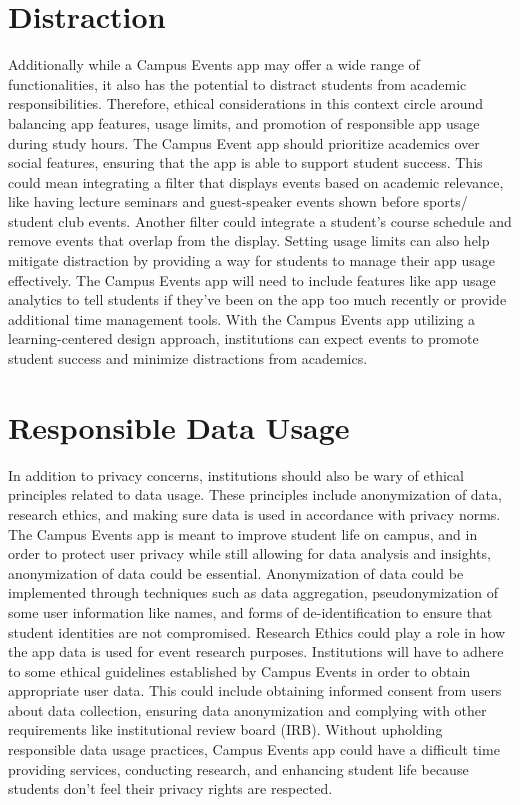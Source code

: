 \documentclass[10pt,twocolumn]{article}
\begin{document}
\section{Distraction}
Additionally while a Campus Events app may offer a wide range of functionalities, it also has the potential to distract students from academic responsibilities. Therefore, ethical considerations in this context circle around balancing app features, usage limits, and promotion of responsible app usage during study hours.
The Campus Event app should prioritize academics over social features, ensuring that the app is able to support student success. This could mean integrating a filter that displays events based on academic relevance, like having lecture seminars and guest-speaker events shown before sports/ student club events. Another filter could integrate a student's course schedule and remove events that overlap from the display. 
Setting usage limits can also help mitigate distraction by providing a way for students to manage their app usage effectively. The Campus Events app will need to include features like app usage analytics to tell students if they've been on the app too much recently or provide additional time management tools.
With the Campus Events app utilizing a learning-centered design approach, institutions can expect events to promote student success and minimize distractions from academics.\cite{Appedus}

\section{Responsible Data Usage}
In addition to privacy concerns, institutions should also be wary of ethical principles related to data usage. These principles include anonymization of data, research ethics, and making sure data is used in accordance with privacy norms.
The Campus Events app is meant to improve student life on campus, and in order to protect user privacy while still allowing for data analysis and insights, anonymization of data could be essential. Anonymization of data could be implemented through techniques such as data aggregation, pseudonymization of some user information like names, and forms of de-identification to ensure that student identities are not compromised. 
Research Ethics could play a role in how the app data is used for event research purposes. Institutions will have to adhere to some ethical guidelines established by Campus Events in order to obtain appropriate user data. This could include obtaining informed consent from users about data collection, ensuring data anonymization and complying with other requirements like institutional review board (IRB).
Without upholding responsible data usage practices, Campus Events app could have a difficult time providing services, conducting research, and enhancing student life because students don't feel their privacy rights are respected. 
\end{document}
